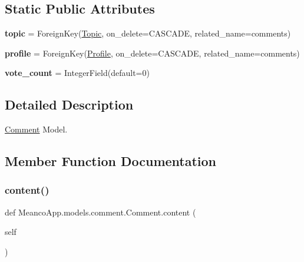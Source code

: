 \subsection*{Static Public Attributes}
\begin{DoxyCompactItemize}
\item 
\hypertarget{class_meanco_app_1_1models_1_1comment_1_1_comment_a0e2cfb9e44609c44d5d39c4ebe8bd2e6}{}\label{class_meanco_app_1_1models_1_1comment_1_1_comment_a0e2cfb9e44609c44d5d39c4ebe8bd2e6} 
{\bfseries topic} = Foreign\+Key(\hyperlink{class_meanco_app_1_1models_1_1topic_1_1_topic}{Topic}, on\+\_\+delete=C\+A\+S\+C\+A\+DE, related\+\_\+name=\textquotesingle{}comments\textquotesingle{})
\item 
\hypertarget{class_meanco_app_1_1models_1_1comment_1_1_comment_aaa60581f405de883dcd72d82831b8fe6}{}\label{class_meanco_app_1_1models_1_1comment_1_1_comment_aaa60581f405de883dcd72d82831b8fe6} 
{\bfseries profile} = Foreign\+Key(\hyperlink{class_meanco_app_1_1models_1_1profile_1_1_profile}{Profile}, on\+\_\+delete=C\+A\+S\+C\+A\+DE, related\+\_\+name=\textquotesingle{}comments\textquotesingle{})
\item 
\hypertarget{class_meanco_app_1_1models_1_1comment_1_1_comment_ab2861351264fffbb4b193c1724941623}{}\label{class_meanco_app_1_1models_1_1comment_1_1_comment_ab2861351264fffbb4b193c1724941623} 
{\bfseries vote\+\_\+count} = Integer\+Field(default=0)
\end{DoxyCompactItemize}


\subsection{Detailed Description}
\hyperlink{class_meanco_app_1_1models_1_1comment_1_1_comment}{Comment} Model. 

\subsection{Member Function Documentation}
\hypertarget{class_meanco_app_1_1models_1_1comment_1_1_comment_a9c6987c2a0309d97cb57aca01a84e689}{}\label{class_meanco_app_1_1models_1_1comment_1_1_comment_a9c6987c2a0309d97cb57aca01a84e689} 
\subsubsection{\texorpdfstring{content()}{content()}}
{\footnotesize\ttfamily def Meanco\+App.\+models.\+comment.\+Comment.\+content (\begin{DoxyParamCaption}\item[{}]{self }\end{DoxyParamCaption})}



